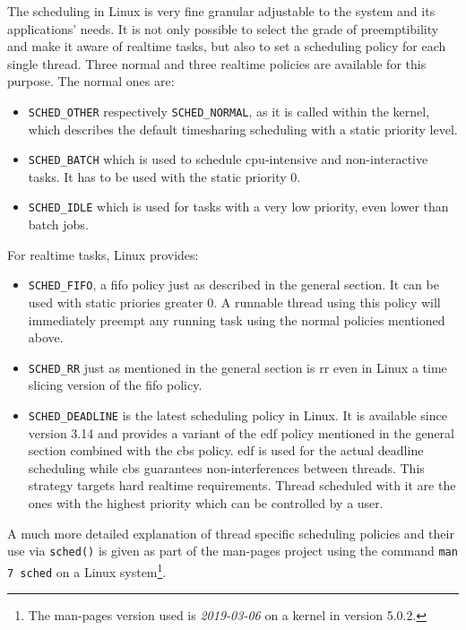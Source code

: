 The scheduling in Linux is very fine granular adjustable to the system and its applications' needs.
It is not only possible to select the grade of preemptibility and make it aware of realtime tasks, but also to set a scheduling policy for each single thread.
Three normal and three realtime policies are available for this purpose.
The normal ones are:
\begin{itemize}
    \item \texttt{SCHED\_OTHER} respectively \texttt{SCHED\_NORMAL}, as it is called within the kernel, which describes the default timesharing scheduling with a static priority level.
    \item \texttt{SCHED\_BATCH} which is used to schedule \ac{cpu}-intensive and non-interactive tasks. It has to be used with the static priority 0.
    \item \texttt{SCHED\_IDLE} which is used for tasks with a very low priority, even lower than batch jobs.
\end{itemize}
For realtime tasks, Linux provides:
\begin{itemize}
    \item \texttt{SCHED\_FIFO}, a \acl{fifo} policy just as described in the general section. It can be used with static priories greater 0. A runnable thread using this policy will immediately preempt any running task using the normal policies mentioned above.
    \item \texttt{SCHED\_RR} just as mentioned in the general section is \acl{rr} even in Linux a time slicing version of the \ac{fifo} policy.
    \item \texttt{SCHED\_DEADLINE} is the latest scheduling policy in Linux. It is available since version 3.14 and provides a variant of the \acl{edf} policy mentioned in the general section combined with the \ac{cbs} policy.
    \ac{edf} is used for the actual deadline scheduling while \ac{cbs} guarantees non-interferences between threads.
    This strategy targets hard realtime requirements. Thread scheduled with it are the ones with the highest priority which can be controlled by a user.
\end{itemize}
A much more detailed explanation of thread specific scheduling policies and their use via \texttt{sched()} is given as part of the man-pages project using the command \texttt{man 7 sched} on a Linux system\footnote{The man-pages version used is \textit{2019-03-06} on a kernel in version 5.0.2.}.  


